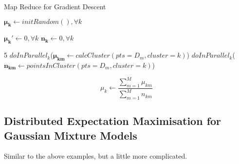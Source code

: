 \documentclass[a4paper]{article}
\begin{document}
	\begin{algorithm}
		\caption{Map Reduce for Gradient Descent}
		\begin{algorithmic}[6]
			  
			
			\State $\mathbf{\mu_k} \gets initRandom(), \forall k$ 
			
			
			\State $\mathbf{\mu_k'} \gets 0, \forall k$ 
			\State $\mathbf{n_k} \gets 0, \forall k$ 
			
			5
			\State $doInParallel_k$($\mathbf{\mu_{km}} \gets calcCluster(pts=D_m,cluster=k)$)
			\State $doInParallel_k$($\mathbf{n_{km}} \gets pointsInCluster(pts=D_m,cluster=k)$)
			
			
			\State $$\mu_k \gets \frac{\sum_{m=1}^{M} \mu_{km}}{\sum_{m=1}^{M}n_{km}}$$
			
			\EndWhile
			
			\EndProcedure
		\end{algorithmic}
	\end{algorithm}
	
	\subsection{Distributed Expectation Maximisation for Gaussian Mixture Models}
	
	Similar to the above examples, but a little more complicated.
	
	
	
	
	
	
\end{document}
